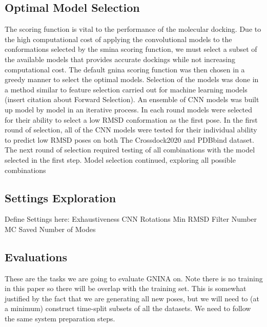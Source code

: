 \documentclass[journal=jcisd8,manuscript=article]{achemso}
\begin{document}
\subsection{Optimal Model Selection}
The scoring function is vital to the performance of the molecular docking. Due to the high computational cost of applying the convolutional models to the conformations selected by the smina scoring function, we must select a subset of the available models that provides accurate dockings while not increasing computational cost. The default gnina scoring function was then chosen in a greedy manner to select the optimal models. Selection of the models was done in a method similar to feature selection carried out for machine learning models (insert citation about Forward Selection). An ensemble of CNN models was built up model by model in an iterative process. In each round models were selected for their ability to select a low RMSD conformation as the first pose. In the first round of selection, all of the CNN models were tested for their individual ability to predict low RMSD poses on both The Crossdock2020 and PDBbind dataset. The next round of selection required testing of all combinations with the model selected in the first step. Model selection continued, exploring all possible combinations 

\subsection{Settings Exploration}
Define Settings here:
Exhaustiveness
CNN Rotations
Min RMSD Filter
Number MC Saved
Number of Modes

\subsection{Evaluations}
These are the tasks we are going to evaluate GNINA on.  Note there is no training in this paper so there will be overlap with the training set.  This is somewhat justified by the fact that we are generating all new poses, but we will need to (at a minimum) construct time-split subsets of all the datasets.  We need to follow the same system preparation steps.
\end{document}

